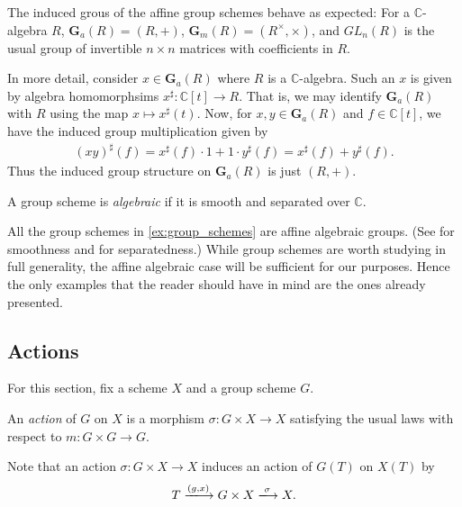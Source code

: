 \documentclass[12pt]{ociamthesis}  %
\begin{document}
\begin{example}
  The induced grous of the affine group schemes behave as expected:
  For a $\mathbb{C}$-algebra $R$, $\mathbf{G}_a(R) = (R,+)$,
  $\mathbf{G}_m(R) = (R^\times,\times)$, and
  $GL_n(R)$ is the usual group of invertible $n\times n$ matrices
  with coefficients in $R$.

  In more detail, consider $x\in\mathbf{G}_a(R)$ where $R$ is
  a $\mathbb{C}$-algebra. Such an $x$ is given by algebra homomorphsims
  $x^\sharp:\mathbb{C}[t] \to R$. That is, we may identify
  $\mathbf{G}_a(R)$ with $R$ using the map $x \mapsto x^\sharp(t)$. Now,
  for $x,y\in\mathbf{G}_a(R)$ and $f\in \mathbb{C}[t]$, we have the
  induced group multiplication given by
  \begin{align*}
    (xy)^\sharp(f)
    = x^\sharp(f) \cdot 1 + 1 \cdot y^\sharp(f)
    = x^\sharp(f) + y^\sharp(f).
  \end{align*}
  Thus the induced group structure on $\mathbf{G}_a(R)$ is just $(R,+)$.
\end{example}

\begin{definition}
  A group scheme is \emph{algebraic} if it is smooth and separated
  over $\mathbb{C}$.
\end{definition}

\begin{example}
  All the group schemes in \ref{ex:group_schemes} are affine algebraic
  groups. (See \cite[IV Theorem 9.3]{milne2012} for smoothness
  and \cite[Remark 3.2]{hoskins2016} for separatedness.) While group
  schemes are worth studying in full generality, the affine algebraic
  case will be sufficient for our purposes. Hence the only examples
  that the reader should have in mind are the ones already presented.
\end{example}

\subsection{Actions}

For this section, fix a scheme $X$ and a group scheme $G$.

\begin{definition}
  An \emph{action} of $G$ on $X$ is a morphism
  $\sigma : G\times X\to X$ satisfying the usual laws with respect
  to $m:G\times G\to G$.
\end{definition}

Note that an action $\sigma : G\times X\to X$ induces an action of
$G(T)$ on $X(T)$ by
\begin{equation*}
  T \xlongrightarrow{(g,x)} G\times X \xlongrightarrow{\sigma} X.
\end{equation*}
\end{document}
